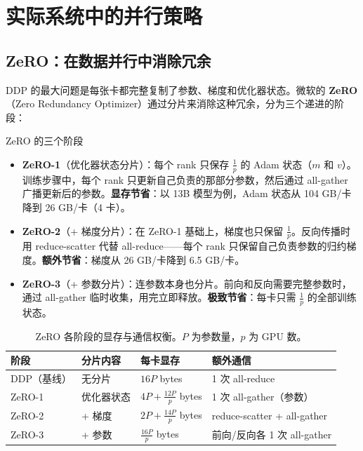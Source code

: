 \section{实际系统中的并行策略}

\subsection{ZeRO：在数据并行中消除冗余}

DDP 的最大问题是每张卡都完整复制了参数、梯度和优化器状态。微软的 \textbf{ZeRO}（Zero Redundancy Optimizer）通过分片来消除这种冗余，分为三个递进的阶段：

\begin{knowledgebox}{ZeRO 的三个阶段}
\begin{itemize}
    \item \textbf{ZeRO-1}（优化器状态分片）：每个 rank 只保存 $\frac{1}{p}$ 的 Adam 状态（$m$ 和 $v$）。训练步骤中，每个 rank 只更新自己负责的那部分参数，然后通过 all-gather 广播更新后的参数。\textbf{显存节省}：以 13B 模型为例，Adam 状态从 104 GB/卡降到 26 GB/卡（4 卡）。
    \item \textbf{ZeRO-2}（+ 梯度分片）：在 ZeRO-1 基础上，梯度也只保留 $\frac{1}{p}$。反向传播时用 reduce-scatter 代替 all-reduce——每个 rank 只保留自己负责参数的归约梯度。\textbf{额外节省}：梯度从 26 GB/卡降到 6.5 GB/卡。
    \item \textbf{ZeRO-3}（+ 参数分片）：连参数本身也分片。前向和反向需要完整参数时，通过 all-gather 临时收集，用完立即释放。\textbf{极致节省}：每卡只需 $\frac{1}{p}$ 的全部训练状态。
\end{itemize}
\end{knowledgebox}

\begin{table}[H]
\centering
\small
\begin{tabular}{p{2.2cm}p{3cm}p{3cm}p{3.8cm}}
\toprule
\textbf{阶段} & \textbf{分片内容} & \textbf{每卡显存} & \textbf{额外通信} \\
\midrule
DDP（基线） & 无分片 & $16P$ bytes & 1 次 all-reduce \\
ZeRO-1 & 优化器状态 & $4P + \frac{12P}{p}$ bytes & 1 次 all-gather（参数） \\
ZeRO-2 & + 梯度 & $2P + \frac{14P}{p}$ bytes & reduce-scatter + all-gather \\
ZeRO-3 & + 参数 & $\frac{16P}{p}$ bytes & 前向/反向各 1 次 all-gather \\
\bottomrule
\end{tabular}
\caption{ZeRO 各阶段的显存与通信权衡。$P$ 为参数量，$p$ 为 GPU 数。}
\end{table}

